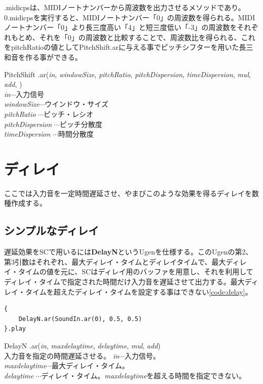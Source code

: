 \documentclass{jsarticle}
\begin{document}
.midicpsは、MIDIノートナンバーから周波数を出力させるメソッドであり。0.midicpsを実行すると、MIDIノートナンバー「0」の周波数を得られる。MIDIノートナンバー「0」より長三度高い「4」と短三度低い「-3」の周波数をそれぞれもとめ、それを「0」の周波数と比較することで、周波数比を得られる、これをpitchRatioの値としてPitchShift.arに与える事でピッチシフターを用いた長三和音を作る事ができる。

\begin{itembox}[l]{PitchShift}
{\footnotesize 
.ar({\it in}, {\it windowSize}, {\it pitchRatio}, {\it pitchDispersion}, {\it timeDispersion}, {\it mul}, {\it add}, )\\

{\it in}$\cdots$入力信号\\
{\it windowSize}$\cdots$ウインドウ・サイズ\\
{\it pitchRatio} $\cdots$ピッチ・レシオ\\
{\it pitchDispersion} $\cdots$ピッチ分散度\\
{\it timeDispersion} $\cdots$時間分散度\\
}
\end{itembox}

\section{ディレイ}
ここでは入力音を一定時間遅延させ、やまびこのような効果を得るディレイを数種作成する。

\subsection{シンプルなディレイ}

遅延効果をSCで用いるには{\bf DelayN}というUgenを仕様する。このUgenの第2、第3引数はそれぞれ、最大ディレイ・タイムとディレイタイムで、最大ディレイ・タイムの値を元に、SCはディレイ用のバッファを用意し、それを利用してディレイ・タイムで指定された時間だけ入力音を遅延させて出力する。最大ディレイ・タイムを超えたディレイ・タイムを設定する事はできない\ref{code:delay}。
\begin{lstlisting}[caption=ディレイ, label=code:delay]
{
	DelayN.ar(SoundIn.ar(0), 0.5, 0.5)
}.play
\end{lstlisting}

\begin{itembox}[l]{DelayN}
	{\footnotesize 
	.ar({\it in}, {\it maxdelaytime}, {\it delaytime}, {\it mul}, {\it add})\\
	入力音を指定の時間遅延させる。
	{\it in}$\cdots$入力信号。\\
	{\it maxdelaytime}$\cdots$最大ディレイ・タイム。\\
	{\it delaytime} $\cdots$ディレイ・タイム。{\it maxdelaytime}を超える時間を指定できない。\\
	}
\end{itembox}
\end{document}
